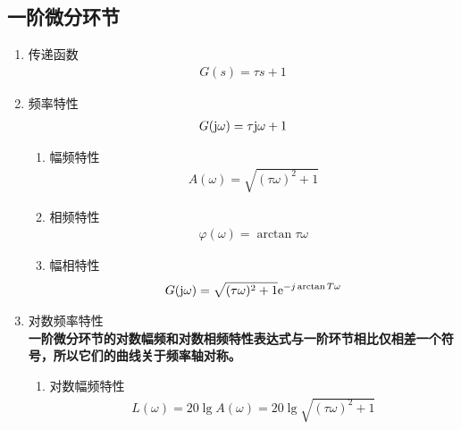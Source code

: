 \subsection{一阶微分环节}

\begin{enumerate}[1.]
	\item 传递函数
	\vspace*{-0.5em}
	\begin{align}
		G(s) = \tau s + 1
	\end{align}
	\vspace*{-3em}
	
	\item 频率特性
	\vspace*{-0.5em}
	\begin{align}
		G(\text{j}  \omega) = \tau \text{j} \omega + 1
	\end{align}
	\vspace*{-3em}
	\begin{enumerate}[(1) ]
		\item 幅频特性
		\vspace*{-0.5em}
		\begin{align}
			A(\omega) = \sqrt{(\tau \omega)^2 + 1}
		\end{align}
		\vspace*{-3em}
		
		\item 相频特性
		\begin{align}
			\varphi(\omega) = \arctan \tau \omega
		\end{align}
		\vspace*{-3em}
		
		\item 幅相特性
		\vspace*{-0.5em}
		\begin{align}
			G(\text{j} \omega) = \sqrt{(\tau \omega)^2 + 1}{\rm{e}}^{-j  \arctan T\omega}
		\end{align}
		\vspace*{-3em}
		
	\end{enumerate}
	\item 对数频率特性\\
	\textbf{一阶微分环节的对数幅频和对数相频特性表达式与一阶环节相比仅相差一个符号，所以它们的曲线关于频率轴对称。}
	\begin{enumerate}[(1) ]
		\item 对数幅频特性
		\vspace*{-0.5em}
		\begin{align}
			L(\omega) = 20 \lg A(\omega) = 20 \lg \sqrt{(\tau \omega)^2 + 1}
		\end{align}
		

\end{enumerate}
\end{enumerate}
